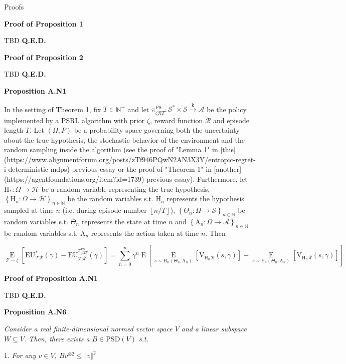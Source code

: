 \documentclass[a4paper]{article}
\newcommand{\Co}[1]{}
\newcommand{\AP}[1]{\left(#1\right)}
\newcommand{\AB}[1]{\left[#1\right]}
\newcommand{\AC}[1]{\left\{#1\right\}}
\newcommand{\Ea}[2]{\underset{#1}{\operatorname{E}}\AB{#2}}
\newcommand{\Nats}{\mathbb{N}}
\newcommand{\PSD}{\mathrm{PSD}}
\newcommand{\Norm}[1]{\left\Vert #1 \right\Vert}
\newcommand{\Floor}[1]{\left\lfloor #1 \right\rfloor}
\newcommand{\K}{\xrightarrow{\mathrm{k}}}
\newcommand{\B}{B}
\newcommand{\St}{\mathcal{S}}
\newcommand{\A}{\mathcal{A}}
\newcommand{\R}{\mathcal{R}}
\newcommand{\T}{\mathcal{T}}
\newcommand{\Hy}{\mathcal{H}}
\newcommand{\V}{\mathrm{V}}
\newcommand{\EU}{\mathrm{EU}}
\newcommand{\PSR}{\text{PS}}
\newcommand{\AT}{\mathrm{A}}
\newcommand{\THy}{\mathrm{H}_*}
\newcommand{\SHy}{\mathrm{H}}
\begin{document}
\begin{Huge}Proofs\end{Huge}

\textbf{Proof of Proposition 1}\Co{b}

TBD \textbf{Q.E.D.}\Co{b}

\textbf{Proof of Proposition 2}\Co{b}

TBD \textbf{Q.E.D.}\Co{b} %

\textbf{Proposition A.N1}\Co{b}

In the setting of Theorem 1, fix $T\in\Nats^+$ and let $\pi_{\zeta\R T}^{\PSR}: \St^*\times\St\K\A$ be the policy implemented by a PSRL algorithm with prior $\zeta$, reward function $\R$ and episode length $T$. Let $(\Omega,P)$ be a probability space governing both the uncertainty about the true hypothesis, the stochastic behavior of the environment and the random sampling inside the algorithm (see the proof of "Lemma 1" in [this](https://www.alignmentforum.org/posts/zTf946PQwN2AN3X3Y/entropic-regret-i-deterministic-mdps) previous essay or the proof of "Theorem 1" in [another](https://agentfoundations.org/item?id=1739) previous essay). Furthermore, let $\THy:\Omega\rightarrow\Hy$ be a random variable representing the true hypothesis, $\AC{\SHy_n:\Omega\rightarrow\Hy}_{n\in\Nats}$ be the random variables s.t. $\SHy_n$ represents the hypothesis sampled at time $n$ (i.e. during episode number $\Floor{n/T}$), $\AC{\Theta_n:\Omega\rightarrow\St}_{n\in\Nats}$ be random variables s.t. $\Theta_n$ represents the state at time $n$ and $\AC{\AT_n:\Omega\rightarrow\A}_{n\in\Nats}$ be random variables s.t. $\AT_n$ represents the action taken at time $n$. Then

$$\Ea{\T\sim\zeta}{\EU^*_{\T\R}(\gamma)-\EU^{\pi_{\zeta\R T}^{\PSR}}_{\T\R}(\gamma)}=\sum_{n=0}^\infty\gamma^{n}\Ea{}{\Ea{s\sim \SHy_n\AP{\Theta_n,\AT_n}}{\V_{\SHy_n\R}(s,\gamma)}-\Ea{s\sim \THy\AP{\Theta_n,\AT_n}}{\V_{\SHy_n\R}(s,\gamma)}}$$

\textbf{Proof of Proposition A.N1}\Co{b}


TBD \textbf{Q.E.D.}\Co{b}

\textbf{Proposition A.N6}\Co{b}

\textit{Consider a real finite-dimensional normed vector space $V$ and a linear subspace $W\subseteq V$. Then, there exists a $\B \in\PSD(V)$ s.t.}\Co{i}

1. \textit{For any $v\in V$, $\B v^{\otimes 2}\leq\Norm{v}^2$}\Co{i}
\end{document}
